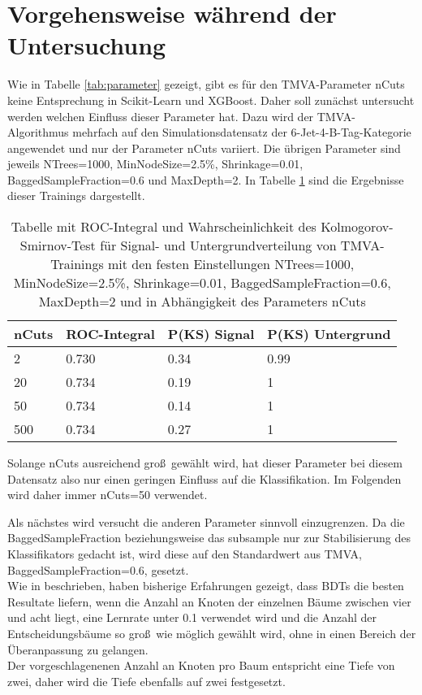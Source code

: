 \section{Vorgehensweise w\"ahrend der Untersuchung}
\label{ch:Vergleich:sec:Vorgehensweise}

Wie in Tabelle \ref{tab:parameter} gezeigt, gibt es f\"ur den TMVA-Parameter nCuts keine Entsprechung in Scikit-Learn und XGBoost. Daher soll zun\"achst untersucht werden welchen Einfluss dieser Parameter hat. Dazu wird der TMVA-Algorithmus mehrfach auf den Simulationsdatensatz der 6-Jet-4-B-Tag-Kategorie angewendet und nur der Parameter nCuts variiert. Die \"ubrigen Parameter sind jeweils NTrees=1000, MinNodeSize=2.5\%, Shrinkage=0.01, BaggedSampleFraction=0.6 und MaxDepth=2.
In Tabelle \ref{tab:nCuts} sind die Ergebnisse dieser Trainings dargestellt.

\begin{table}[tbp]\parbox{12cm}{
  \caption[Variation des TMVA-nCuts-Parameters]{Tabelle mit ROC-Integral und Wahrscheinlichkeit des Kolmogorov-Smirnov-Test f\"ur Signal- und Untergrundverteilung von TMVA-Trainings mit den festen Einstellungen NTrees=1000, MinNodeSize=2.5\%, Shrinkage=0.01, BaggedSampleFraction=0.6, MaxDepth=2 und in Abh\"angigkeit des Parameters nCuts}%
  }\label{tab:nCuts}
  \begin{center}
  \begin{tabular}{llll}
  \hline
  nCuts & ROC-Integral & P(KS) Signal & P(KS) Untergrund\\
  \hline
  \num{2} & \num{0,730} & \num{0,34} & \num{0,99}\\
 \num{20} & \num{0,734} & \num{0,19} & \num{1}\\
 \num{50} & \num{0,734} & \num{0,14} & \num{1}\\
\num{500} & \num{0,734} & \num{0,27} & \num{1}\\
  \hline
  \end{tabular}
  \end{center}
\end{table}

Solange nCuts ausreichend gro\ss~gew\"ahlt wird, hat dieser Parameter bei diesem Datensatz also nur einen geringen Einfluss auf die Klassifikation. Im Folgenden wird daher immer nCuts=\num{50} verwendet.

Als n\"achstes wird versucht die anderen Parameter sinnvoll einzugrenzen. Da die BaggedSampleFraction beziehungsweise das subsample nur zur Stabilisierung des Klassifikators gedacht ist, wird diese auf den Standardwert aus TMVA, BaggedSampleFraction=\num{0,6}, gesetzt.\\
Wie in \cite{SWB-307748006} beschrieben, haben bisherige Erfahrungen gezeigt, dass BDTs die besten Resultate liefern, wenn die Anzahl an Knoten der einzelnen B\"aume zwischen vier und acht liegt, eine Lernrate unter \num{0,1} verwendet wird und die Anzahl der Entscheidungsb\"aume so gro\ss~wie m\"oglich gew\"ahlt wird, ohne in einen Bereich der \"Uberanpassung zu gelangen.\\
Der vorgeschlagenenen Anzahl an Knoten pro Baum entspricht eine Tiefe von zwei, daher wird die Tiefe ebenfalls auf zwei festgesetzt.

